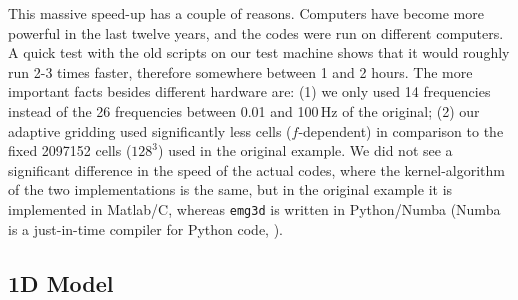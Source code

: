 \documentclass[
    manuscript,
  ]{geophysics}
\newcommand{\emg}[2]{\texttt{emg#1#2}\xspace}
\begin{document}
This massive speed-up has a couple of reasons. Computers have become more
powerful in the last twelve years, and the codes were run on different
computers. A quick test with the old scripts on our test machine shows that it
would roughly run 2-3 times faster, therefore somewhere between 1 and 2 hours.
The more important facts besides different hardware are: (1) we only used 14
frequencies instead of the 26 frequencies between 0.01 and 100\,Hz of the
original; (2) our adaptive gridding used significantly less cells
($f$-dependent) in comparison to the fixed \num{2097152} cells ($128^3$) used
in the original example. We did not see a significant difference in the speed
of the actual codes, where the kernel-algorithm of the two implementations is
the same, but in the original example it is implemented in Matlab/C, whereas
\emg3d is written in Python/Numba (Numba is a just-in-time compiler for Python
code, \citealp{Numba}).

\subsection{1D Model}
\end{document}
